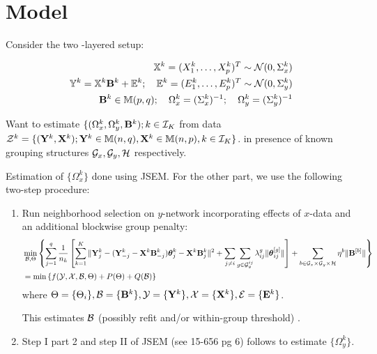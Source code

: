 \documentclass[12pt, letterpaper]{article}
\theoremstyle{definition}
\numberwithin{equation}{section}
\begin{document}
\section{Model}
Consider the two -layered setup:

\begin{eqnarray}
{\mathbb{X}}^k = (X^k_1, \ldots, X^k_p)^T \sim {\cal{N}} (0, \Sigma^k_x)\\
{\mathbb{Y}}^k = {\mathbb{X}}^k {\mathbf{B}}^k + {\mathbb{E}}^k; \quad {\mathbb{E}}^k = (E^k_1, \ldots, E^k_p)^T \sim {\cal{N}} (0, \Sigma^k_y)\\
{\mathbf{B}}^k \in {\mathbb{M}}(p,q); \quad \Omega^k_x = (\Sigma^k_x)^{-1}; \quad \Omega^k_y = (\Sigma^k_y)^{-1}
\end{eqnarray}

Want to estimate $\{ (\Omega^k_x, \Omega^k_y, {\mathbf{B}}^k); k \in {\cal{I}}_K$ from data ${\cal{Z}}^k = \{ ({\mathbf{Y}}^k, {\mathbf{X}}^k); {\mathbf{Y}}^k \in {\mathbb{M}}(n,q), {\mathbf{X}}^k \in {\mathbb{M}}(n,p), k \in {\cal{I}}_K\}$. in presence of known grouping structures ${\cal{G}}_x, {\cal{G}}_y, {\cal{H}}$ respectively. 


Estimation of $\{ \Omega_x^k \}$ done using JSEM. For the other part, we use the following two-step procedure:

\begin{enumerate}
\item Run neighborhood selection on $y$-network incorporating effects of $x$-data and an additional blockwise group penalty:
%
\begin{align}
& \min_{{\cal{B}}, \Theta} \left\{ \sum_{j=1}^q  \frac{1}{n_k} \left[ \sum_{k=1}^K \| {\mathbf{Y}}^k_j - ({\mathbf{Y}}_{-j}^k - {\mathbf{X}}^k {\mathbf{B}}_{-j}^k) {\boldsymbol{\theta}}_j^k - {\mathbf{X}}^k {\mathbf{B}}_j^k \|^2 + \sum_{j \neq i} \sum_{g \in {\cal{G}}_y^{ij}} \lambda_{ij}^g \| {\boldsymbol{\theta}}_{ij}^{[g]} \| \right] + \sum_{b \in {\cal{G}}_x \times {\cal{G}}_y \times {\cal{H}}} \eta^b \| {\mathbf{B}}^{[b]} \| \right\}\\
&= \min \left\{ f ( {\cal{Y}}, {\cal{X}}, {\cal{B}}, \Theta) + P (\Theta) + Q ({\cal{B}}) \right\} 
\end{align}
%
where $\Theta = \{ \Theta_i \}, {\cal{B}} = \{ {\mathbf{B}}^k \}, {\cal{Y}} = \{ {\mathbf{Y}}^k \}, {\cal{X}} = \{ {\mathbf{X}}^k \}, {\cal{E}} = \{ {\mathbf{E}}^k \}$.

This estimates ${\cal{B}}$ { \colrbf (possibly refit and/or within-group threshold) }.

\item Step I part 2 and step II of JSEM (see 15-656 pg 6) follows to estimate $\{ \Omega_y^k \}$.
\end{enumerate}
\end{document}
